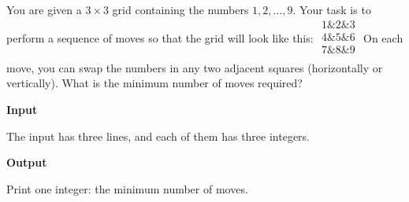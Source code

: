 You are given a $3 \times 3$ grid containing the numbers $1,2,\dots,9$. Your task is to perform a sequence of moves so that the grid will look like this:
$
\begin{matrix}
1 \& 2 \& 3 \\
4 \& 5 \& 6 \\
7 \& 8 \& 9 \\
\end{matrix}
$
On each move, you can swap the numbers in any two adjacent squares (horizontally or vertically). What is the minimum number of moves required?

\vspace{0.3cm}\noindent\textbf{Input}

The input has three lines, and each of them has three integers.

\vspace{0.3cm}\noindent\textbf{Output}

Print one integer: the minimum number of moves.